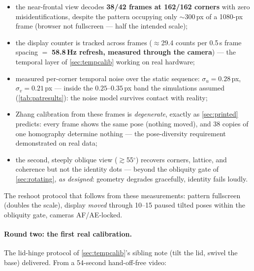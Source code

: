 \documentclass[11pt]{article}
\theoremstyle{definition}
\begin{document}
\begin{itemize}
  \item the near-frontal view decodes \textbf{38/42 frames at
        162/162 corners} with zero misidentifications, despite the
        pattern occupying only $\sim$300\,px of a 1080-px frame
        (browser not fullscreen --- half the intended scale);
  \item the display counter is tracked across frames
        ($\approx$29.4 counts per 0.5\,s frame spacing $=$
        \textbf{58.8\,Hz refresh, measured through the camera}) ---
        the temporal layer of \autoref{sec:tempcalib} working on real
        hardware;
  \item measured per-corner temporal noise over the static sequence:
        $\sigma_u = 0.28$\,px, $\sigma_v = 0.21$\,px --- inside the
        $0.25$--$0.35$\,px band the simulations assumed
        (\autoref{tab:patresults}): the noise model survives contact
        with reality;
  \item Zhang calibration from these frames is \emph{degenerate},
        exactly as \autoref{sec:printed} predicts: every frame shows
        the same pose (nothing moved), and 38 copies of one homography
        determine nothing --- the pose-diversity requirement
        demonstrated on real data;
  \item the second, steeply oblique view ($\gtrsim$55$^\circ$)
        recovers corners, lattice, and coherence but not the identity
        dots --- beyond the obliquity gate of \autoref{sec:rotating},
        \emph{as designed}: geometry degrades gracefully, identity
        fails loudly.
\end{itemize}

The reshoot protocol that follows from these measurements: pattern
fullscreen (doubles the scale), display \emph{moved} through
10--15 paused tilted poses within the obliquity gate, cameras
AF/AE-locked.

\paragraph{Round two: the first real calibration.} The lid-hinge
protocol of \autoref{sec:tempcalib}'s sibling note (tilt the lid,
swivel the base) delivered. From a 54-second hand-off-free video:
\end{document}

